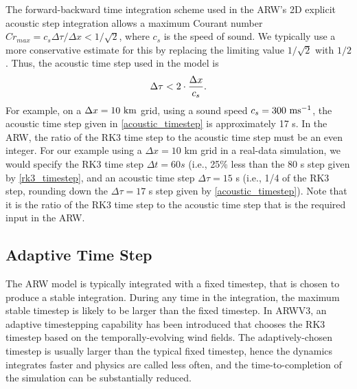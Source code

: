 The forward-backward time integration scheme used in the ARW's 2D
explicit acoustic step integration allows a maximum Courant number
$Cr_{max} = c_s \Delta \tau/\Delta x < 1/\sqrt{2}$, where $c_s$ is the
speed of sound.  We typically use a more conservative estimate for this
by replacing the limiting value $1/\sqrt{2}$ with $1/2$.  Thus, the acoustic
time step used in the model is
%
\begin{equation}
\Delta \tau < 2 \cdot {\Delta x \over c_s}.
\label{acoustic_timestep}
\end{equation}
%
\noindent
For example, on a $\Delta x = 10 \,\, \hbox{km}$ grid, using a sound
speed $c_s = 300 \,\, \hbox{ms}^{-1}$, the acoustic time step given in
\eqref{acoustic_timestep} is approximately 17 s.  In the ARW, the
ratio of the RK3 time step to the acoustic time step must be an even
integer.  For our example using a $\Delta x = 10$ km grid in a
real-data simulation, we would specify the RK3 time step $\Delta t = 60
s$ (i.e., 25\% less than the 80 s step given by \eqref{rk3_timestep},
and an acoustic time step $\Delta \tau = 15$ s (i.e., 1/4 of the RK3
step, rounding down the $\Delta \tau = 17$ s step given by
\eqref{acoustic_timestep}).  Note that it is the ratio of the RK3
time step to the acoustic time step that is the required input in the ARW.


\subsection{Adaptive Time Step}
\label{adaptive_time_step}

The ARW model is typically integrated with a fixed timestep, 
that is chosen to produce a stable integration.  During any time in
the integration, the maximum stable timestep is likely to be larger than
the fixed timestep.  In ARWV3, an adaptive timestepping capability has
been introduced that chooses the RK3 timestep based on the temporally-evolving
wind fields.  The adaptively-chosen timestep is usually larger than the
typical fixed timestep, hence the dynamics integrates faster and
physics are called less often, and the time-to-completion of the
simulation can be substantially reduced.

